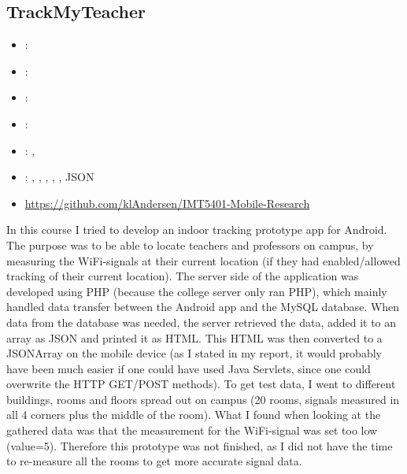 \subsection{TrackMyTeacher}
\label{sec:trackmyteacher}
\begin{itemize} 
	\item {}: 
	\item {}: 
	\item {}: 
	\item {}: 
	\item {}: , 
	\item {}: , , , , , JSON
	\item {} \url{https://github.com/klAndersen/IMT5401-Mobile-Research}
\end{itemize} 
In this course I tried to develop an indoor tracking prototype app for Android. 
The purpose was to be able to locate teachers and professors on campus, by measuring the WiFi-signals at their current location 
(if they had enabled/allowed tracking of their current location).
\vspace{0.5em}\newline
The server side of the application was developed using PHP (because the college server only ran PHP), which mainly handled data transfer between the Android app and the MySQL database.
When data from the database was needed, the server retrieved the data, added it to an array as JSON and printed it as HTML. 
This HTML was then converted to a JSONArray on the mobile device (as I stated in my report, it would probably have been much easier if one could have used Java Servlets, 
since one could overwrite the HTTP GET/POST methods).
\vspace{0.5em}\newline
To get test data, I went to different buildings, rooms and floors spread out on campus (20 rooms, signals measured in all 4 corners plus the middle of the room). 
What I found when looking at the gathered data was that the measurement for the WiFi-signal was set too low (value=5). 
Therefore this prototype was not finished, as I did not have the time to re-measure all the rooms to get more accurate signal data.

